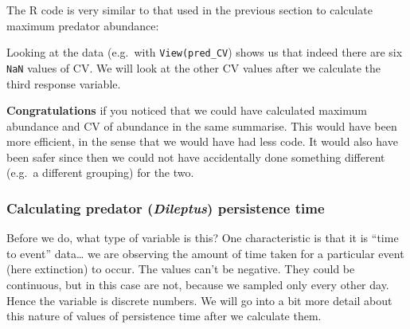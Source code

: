 \documentclass[]{book}
\newenvironment{Shaded}{\begin{snugshade}}{\end{snugshade}}
\newcommand{\DataTypeTok}[1]{\textcolor[rgb]{0.13,0.29,0.53}{#1}}
\newcommand{\DecValTok}[1]{\textcolor[rgb]{0.00,0.00,0.81}{#1}}
\newcommand{\KeywordTok}[1]{\textcolor[rgb]{0.13,0.29,0.53}{\textbf{#1}}}
\newcommand{\NormalTok}[1]{#1}
\newcommand{\OperatorTok}[1]{\textcolor[rgb]{0.81,0.36,0.00}{\textbf{#1}}}
\newcommand{\StringTok}[1]{\textcolor[rgb]{0.31,0.60,0.02}{#1}}
\begin{document}
The R code is very similar to that used in the previous section to calculate maximum predator abundance:

\begin{Shaded}
\end{Shaded}

Looking at the data (e.g.~with \texttt{View(pred\_CV}) shows us that indeed there are six \texttt{NaN} values of CV. We will look at the other CV values after we calculate the third response variable.

\begin{efficiency}
\textbf{Congratulations} if you noticed that we could have calculated
maximum abundance and CV of abundance in the same summarise. This would
have been more efficient, in the sense that we would have had less code.
It would also have been safer since then we could not have accidentally
done something different (e.g.~a different grouping) for the two.
\end{efficiency}

\hypertarget{calculating-predator-dileptus-persistence-time}{%
\subsubsection{\texorpdfstring{Calculating predator (\emph{Dileptus}) persistence time}{Calculating predator (Dileptus) persistence time}}\label{calculating-predator-dileptus-persistence-time}}

Before we do, what type of variable is this? One characteristic is that it is ``time to event'' data\ldots{} we are observing the amount of time taken for a particular event (here extinction) to occur. The values can't be negative. They could be continuous, but in this case are not, because we sampled only every other day. Hence the variable is discrete numbers. We will go into a bit more detail about this nature of values of persistence time after we calculate them.
\end{document}
